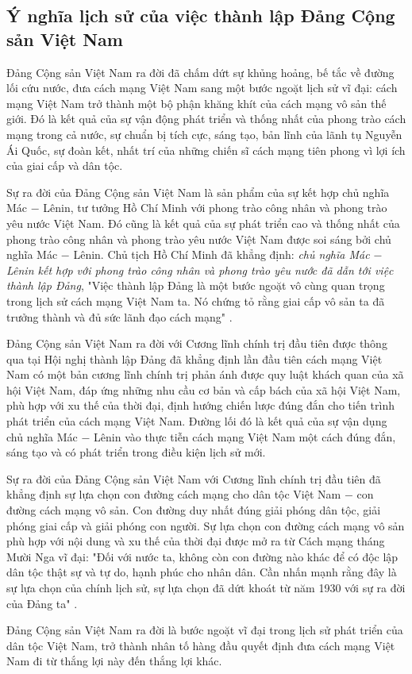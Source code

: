 \subsection{Ý nghĩa lịch sử của việc thành lập Đảng Cộng sản Việt Nam}
Đảng Cộng sản Việt Nam ra đời đã chấm dứt sự khủng hoảng, bế tắc về đường lối cứu nước, đưa cách mạng Việt Nam sang một bước ngoặt lịch sử vĩ đại: cách mạng Việt Nam trở thành một bộ phận khăng khít của cách mạng vô sản thế giới. Đó là kết quả của sự vận động phát triển và thống nhất của phong trào cách mạng trong cả nước, sự chuẩn bị tích cực, sáng tạo, bản lĩnh của lãnh tụ Nguyễn Ái Quốc, sự đoàn kết, nhất trí của những chiến sĩ cách mạng tiên phong vì lợi ích của giai cấp và dân tộc. 

Sự ra đời của Đảng Cộng sản Việt Nam là sản phẩm của sự kết hợp chủ nghĩa Mác $-$ Lênin, tư tưởng Hồ Chí Minh với phong trào công nhân và phong trào yêu nước Việt Nam. Đó cũng là kết quả của sự phát triển cao và thống nhất của phong trào công nhân và phong trào yêu nước Việt Nam được soi sáng bởi chủ nghĩa Mác $-$ Lênin. Chủ tịch Hồ Chí Minh đã khẳng định: \textit{chủ nghĩa Mác $-$ Lênin kết hợp với phong trào công nhân và phong trào yêu nước đã dẫn tới việc thành lập Đảng}, "Việc thành lập Đảng là một bước ngoặt vô cùng quan trọng trong lịch sử cách mạng Việt Nam ta. Nó chứng tỏ rằng giai cấp vô sản ta đã trưởng thành và đủ sức lãnh đạo cách mạng" .

Đảng Cộng sản Việt Nam ra đời với Cương lĩnh chính trị đầu tiên được thông qua tại Hội nghị thành lập Đảng đã khẳng định lần đầu tiên cách mạng Việt Nam có một bản cương lĩnh chính trị phản ánh được quy luật khách quan của xã hội Việt Nam, đáp ứng những nhu cầu cơ bản và cấp bách của xã hội Việt Nam, phù hợp với xu thế của thời đại, định hướng chiến lược đúng đắn cho tiến trình phát triển của cách mạng Việt Nam. Đường lối đó là kết quả của sự vận dụng chủ nghĩa Mác $-$ Lênin vào thực tiễn cách mạng Việt Nam một cách đúng đắn, sáng tạo và có phát triển trong điều kiện lịch sử mới.

Sự ra đời của Đảng Cộng sản Việt Nam với Cương lĩnh chính trị đầu tiên đã khẳng định sự lựa chọn con đường cách mạng cho dân tộc Việt Nam $-$ con đường cách mạng vô sản. Con đường duy nhất đúng giải phóng dân tộc, giải phóng giai cấp và giải phóng con người. Sự lựa chọn con đường cách mạng vô sản phù hợp với nội dung và xu thế của thời đại được mở ra từ Cách mạng tháng Mười Nga vĩ đại: "Đối với nước ta, không còn con đường nào khác để có độc lập dân tộc thật sự và tự do, hạnh phúc cho nhân dân. Cần nhấn mạnh rằng đây là sự lựa chọn của chính lịch sử, sự lựa chọn đã dứt khoát từ năm 1930 với sự ra đời của Đảng ta" .

Đảng Cộng sản Việt Nam ra đời là bước ngoặt vĩ đại trong lịch sử phát triển của dân tộc Việt Nam, trở thành nhân tố hàng đầu quyết định đưa cách mạng Việt Nam đi từ thắng lợi này đến thắng lợi khác.
